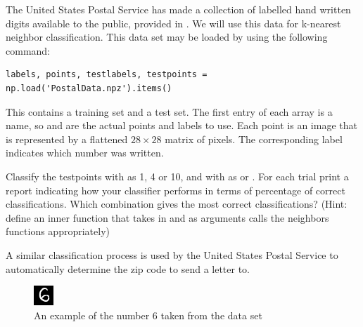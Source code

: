 \begin{problem} %
The United States Postal Service has made a collection of labelled hand written digits available to the public, provided in .
We will use this data for k-nearest neighbor classification.
This data set may be loaded by using the following command:
\begin{lstlisting}
labels, points, testlabels, testpoints = np.load('PostalData.npz').items()
\end{lstlisting}
This contains a training set and a test set.
The first entry of each array is a name, so  and  are the actual points and labels to use.
Each point is an image that is represented by a flattened $28 \times 28$ matrix of pixels.
The corresponding label indicates which number was written.

Classify the testpoints with  as 1, 4 or 10, and with  as  or .
For each trial print a report indicating how your classifier performs in terms of percentage of correct classifications.
Which combination gives the most correct classifications?
(Hint: define an inner function that takes in  and  as arguments calls the neighbors functions appropriately)

A similar classification process is used by the United States Postal Service to automatically determine the zip code to send a letter to.

\begin{figure}[H]
\includegraphics[width=.25\textwidth]{figures/Example.png}
\caption{An example of the number 6 taken from the data set}
\end{figure}
\end{problem}

